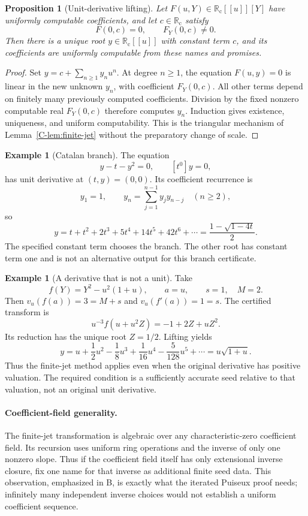\documentclass[11pt,letterpaper]{article}
\numberwithin{equation}{section}
\newtheorem{proposition}[theorem]{Proposition}
\theoremstyle{definition}
\newtheorem{example}[theorem]{Example}
\theoremstyle{remark}
\newcommand{\Rc}{\mathbb R_{\mathrm c}}
\begin{document}
\begin{proposition}[Unit-derivative lifting]
\label{C-prop:unit-hensel}
Let $F(u,Y)\in\Rc[[u]][Y]$ have uniformly computable coefficients, and let
$c\in\Rc$ satisfy
\[
 F(0,c)=0,\qquad F_Y(0,c)\ne0.
\]
Then there is a unique root $y\in\Rc[[u]]$ with constant term $c$, and its
coefficients are uniformly computable from these names and promises.
\end{proposition}
\begin{proof}
Set $y=c+\sum_{n\geq1}y_nu^n$. At degree $n\geq1$, the equation $F(u,y)=0$
is linear in the new unknown $y_n$, with coefficient $F_Y(0,c)$.
All other terms depend on finitely many previously computed coefficients.
Division by the fixed nonzero computable real $F_Y(0,c)$ therefore computes
$y_n$. Induction gives existence, uniqueness, and uniform computability.
This is the triangular mechanism of Lemma~\ref{C-lem:finite-jet} without the
preparatory change of scale.
\end{proof}

\begin{example}[Catalan branch]
The equation
\[
 y-t-y^2=0,\qquad [t^0]y=0,
\]
has unit derivative at $(t,y)=(0,0)$. Its coefficient recurrence is
\[
 y_1=1,\qquad y_n=\sum_{j=1}^{n-1}y_jy_{n-j}\quad(n\geq2),
\]
so
\[
 y=t+t^2+2t^3+5t^4+14t^5+42t^6+\cdots
   =\frac{1-\sqrt{1-4t}}2.
\]
The specified constant term chooses the branch. The other root has constant
term one and is not an alternative output for this branch certificate.
\end{example}

\begin{example}[A derivative that is not a unit]
Take
\[
 f(Y)=Y^2-u^2(1+u),\qquad a=u,
 \qquad s=1,\quad M=2.
\]
Then $v_u(f(a))=3=M+s$ and $v_u(f'(a))=1=s$. The certified transform is
\[
 u^{-3}f(u+u^2Z)=-1+2Z+uZ^2.
\]
Its reduction has the unique root $Z=1/2$. Lifting yields
\[
 y=u+\frac12u^2-\frac18u^3+\frac1{16}u^4
       -\frac5{128}u^5+\cdots=u\sqrt{1+u}.
\]
Thus the finite-jet method applies even when the original derivative has
positive valuation. The required condition is a sufficiently accurate seed
relative to that valuation, not an original unit derivative.
\end{example}


\paragraph{Coefficient-field generality.}
The finite-jet transformation is algebraic over any characteristic-zero
coefficient field. Its recursion uses uniform ring operations and the inverse
of only one nonzero slope. Thus if the coefficient field itself has only
extensional inverse closure, fix one name for that inverse as additional
finite seed data. This observation, emphasized in B, is exactly what the
iterated Puiseux proof needs; infinitely many independent inverse choices
would not establish a uniform coefficient sequence.
\end{document}
